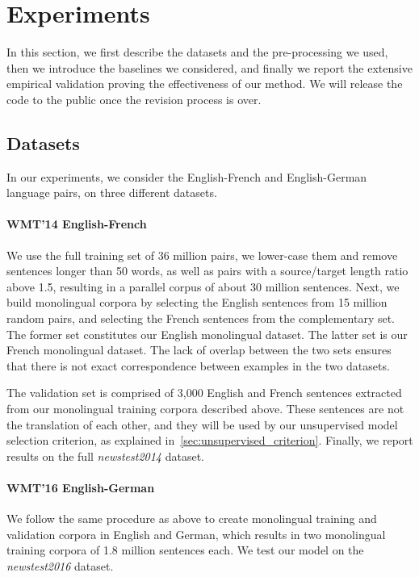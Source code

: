 \section{Experiments}
\label{sec:experiments}
In this section, we first describe the datasets and the pre-processing we used, then we introduce the baselines we considered, and finally we report the extensive empirical validation proving the effectiveness of our method. We will release the code to the public once the revision process is over. 
\subsection{Datasets}

In our experiments, we consider the English-French and English-German language pairs, on three different datasets.

\paragraph{WMT'14 English-French} We use the full training set of 36 million pairs, we lower-case them and remove sentences longer than 50 words, as well as pairs with a source/target length ratio above 1.5, resulting in a parallel corpus of about 30 million sentences. Next, we build monolingual corpora by selecting the English sentences from 15 million random pairs, and selecting the French sentences from the complementary set. The former set constitutes our English monolingual dataset. The latter set is our French monolingual dataset. The lack of overlap between the two sets ensures that there is not exact correspondence between examples in the two datasets.

The validation set is comprised of 3,000 English and French sentences extracted from our  monolingual training corpora described above. These sentences are not the translation of each other, and they will be used by our unsupervised model selection criterion, as explained in~\ref{sec:unsupervised_criterion}. Finally, we report results on the full \textit{newstest2014} dataset.

\paragraph{WMT'16 English-German} We follow the same procedure as above to create monolingual training and validation corpora in English and German, which results in two monolingual training corpora of 1.8 million sentences each. We test our model on the \textit{newstest2016} dataset.

